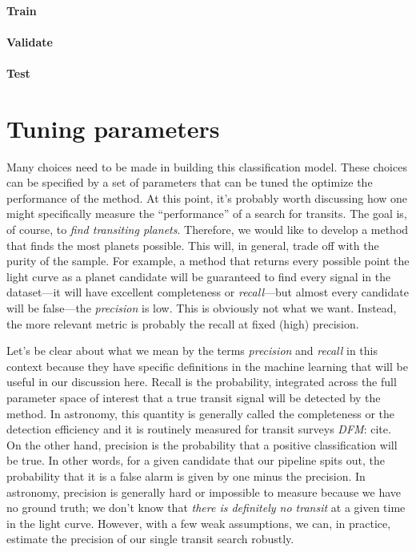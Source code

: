 \documentclass[12pt,preprint]{aastex}
\newcommand{\sectlabel}[1]{\label{sect:#1}}
\newcommand{\todo}[3]{{\color{#2}\emph{#1}: #3}}
\newcommand{\dfmtodo}[1]{\todo{DFM}{red}{#1}}
\begin{document}
\paragraph{Train}




\paragraph{Validate}

\paragraph{Test}


\section{Tuning parameters}\sectlabel{tuning}

Many choices need to be made in building this classification model.
These choices can be specified by a set of parameters that can be tuned the
optimize the performance of the method.
At this point, it's probably worth discussing how one might specifically
measure the ``performance'' of a search for transits.
The goal is, of course, to \emph{find transiting planets}.
Therefore, we would like to develop a method that finds the most planets
possible.
This will, in general, trade off with the purity of the sample.
For example, a method that returns every possible point the light curve as a
planet candidate will be guaranteed to find every signal in the dataset---it
will have excellent completeness or \emph{recall}---but almost every
candidate will be false---the \emph{precision} is low.
This is obviously not what we want.
Instead, the more relevant metric is probably the recall at fixed (high)
precision.

Let's be clear about what we mean by the terms \emph{precision} and
\emph{recall} in this context because they have specific definitions in the
machine learning that will be useful in our discussion here.
Recall is the probability, integrated across the full parameter space of
interest that a true transit signal will be detected by the method.
In astronomy, this quantity is generally called the completeness or the
detection efficiency and it is routinely measured for transit surveys
\dfmtodo{cite}.
On the other hand, precision is the probability that a positive classification
will be true.
In other words, for a given candidate that our pipeline spits out, the
probability that it is a false alarm is given by one minus the precision.
In astronomy, precision is generally hard or impossible to measure because we
have no ground truth; we don't know that \emph{there is definitely no transit}
at a given time in the light curve.
However, with a few weak assumptions, we can, in practice, estimate the
precision of our single transit search robustly.
\end{document}
